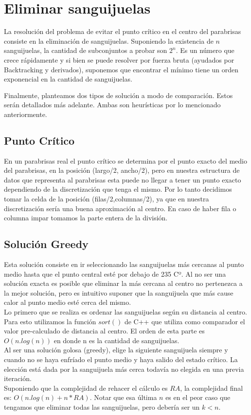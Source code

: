 \section{Eliminar sanguijuelas}

La resolución del problema de evitar el punto crítico en el centro del parabrisas consiste en la eliminación de sanguijuelas. Suponiendo la existencia de $n$ sanguijuelas, la cantidad de subconjuntos a probar son $2^n$. Es un número que crece rápidamente y si bien se puede resolver por fuerza bruta (ayudados por Backtracking y derivados), suponemos que encontrar el mínimo tiene un orden exponencial en la cantidad de sanguijuelas.

Finalmente, planteamos dos tipos de solución a modo de comparación. Estos serán detallados más adelante. Ambas son heurísticas por lo mencionado anteriormente.

\subsection{Punto Crítico}
En un parabrisas real el punto crítico se determina por el punto exacto del medio del parabrisas, en la posición (largo/2, ancho/2), pero en nuestra estructura de datos que representa al parabrisas esta puede no llegar a tener un punto exacto dependiendo de la discretización que tenga el mismo. Por lo tanto decidimos tomar la celda de la posición (filas/2,columnas/2), ya que en nuestra discretización sería una buena aproximación al centro. En caso de haber fila o columna impar tomamos la parte entera de la división.

\subsection{Solución Greedy}
Esta solución consiste en ir seleccionando las sanguijuelas más cercanas al punto medio hasta que el punto central esté por debajo de 235 Cº. Al no ser una solución exacta es posible que eliminar la más cercana al centro no pertenezca a la mejor solución, pero es intuitivo suponer que la sanguijuela que más cause calor al punto medio esté cerca del mismo. \\
Lo primero que se realiza es ordenar las sanguijuelas según su distancia al centro. Para esto utilizamos la función $sort()$ de C++ que utiliza como comparador el valor pre-calculado de distancia al centro. El orden de esta parte es $O(n.log(n))$ en donde n es la cantidad de sanguijuelas.\\
Al ser una solución golosa (greedy), elige la siguiente sanguijuela siempre y cuando no se haya enfríado el punto medio y haya salido del estado crítico. La elección está dada por la sanguijuela más cerca todavía no elegida en una previa iteración.\\
Suponiendo que la complejidad de rehacer el cálculo es $RA$, la complejidad final es:  $O(n.log(n) + n*RA)$. Notar que esa última $n$ es en el peor caso que tengamos que eliminar todas las sanguijuelas, pero debería ser un $k < n$.



